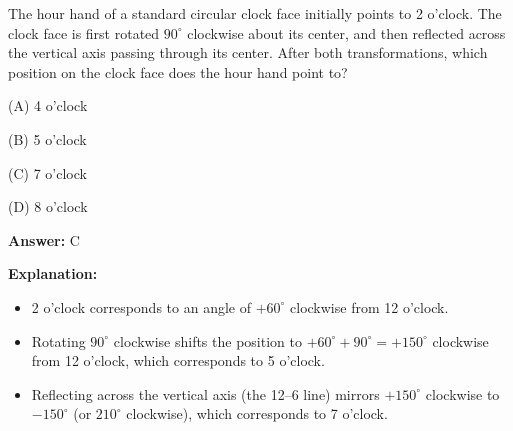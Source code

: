 \begin{tcolorbox}[enhanced,breakable,colback=boxgray,colframe=gray!45,boxrule=0.4pt,arc=2pt,left=6pt,right=6pt,top=4pt,bottom=4pt,title={Q.2},fonttitle=\bfseries\small,coltitle=black,colbacktitle=gray!15]
\small The hour hand of a standard circular clock face initially points to 2 o'clock. The clock face is first rotated $90^\circ$ clockwise about its center, and then reflected across the vertical axis passing through its center. After both transformations, which position on the clock face does the hour hand point to?\par\par\hspace*{1em}(A) 4 o'clock\par\hspace*{1em}(B) 5 o'clock\par\hspace*{1em}(C) 7 o'clock\par\hspace*{1em}(D) 8 o'clock\par{}\par\smallskip\textbf{Answer:} C\par\par\textbf{Explanation:} \begin{itemize}[leftmargin=1.4em,itemsep=1pt]
\item 2 o'clock corresponds to an angle of $+60^\circ$ clockwise from 12 o'clock.
\item Rotating $90^\circ$ clockwise shifts the position to $+60^\circ + 90^\circ = +150^\circ$ clockwise from 12 o'clock, which corresponds to 5 o'clock.
\item Reflecting across the vertical axis (the 12–6 line) mirrors $+150^\circ$ clockwise to $-150^\circ$ (or $210^\circ$ clockwise), which corresponds to 7 o'clock.
\end{itemize}
\end{tcolorbox}


